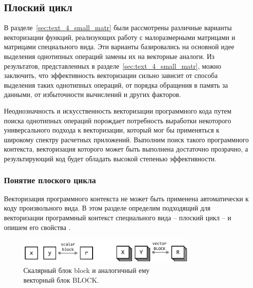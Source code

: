 
\subsection{Плоский цикл}\label{sec:text_4_flat}

В разделе~\ref{sec:text_4_small_matr} были рассмотрены различные варианты векторизации функций, реализующих работу с малоразмерными матрицами и матрицами специального вида.
Эти варианты базировались на основной идее выделения однотипных операций замены их на векторные аналоги.
Из результатов, представленных в разделе~\ref{sec:text_4_small_matr}, можно заключить, что эффективность векторизации сильно зависит от способа выделения таких однотипных операций, от порядка обращения в память за данными, от избыточности вычислений и других факторов.

Неоднозначность и искусственность векторизации программного кода путем поиска однотипных операций порождает потребность выработки некоторого универсального подхода к векторизации, который мог бы применяться к широкому спектру расчетных приложений.
Выполним поиск такого программного контекста, векторизация которого может быть выполнена достаточно прозрачно, а результирующий код будет обладать высокой степенью эффективности.

\subsubsection{Понятие плоского цикла}

Векторизация программного контекста не может быть применена автоматически к коду произвольного вида.
В этом разделе определим подходящий для векторизации программный контекст специального вида -- плоский цикл -- и опишем его свойства \cite{Shabanov2021VecCFG}.

\begin{figure}[ht]
\centering
\includegraphics[width=0.8\textwidth]{./fig/vec_block_BLOCK.pdf}
\singlespacing
{}\caption{Скалярный блок block и аналогичный ему \\ векторный блок BLOCK.}
\label{fig:text_4_vec_flat_fun_FUN}
\end{figure}

